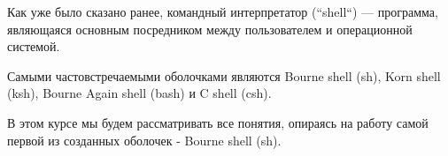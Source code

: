 Как уже было сказано ранее, командный интерпретатор (“shell“) --- программа, являющаяся основным посредником между пользователем и операционной системой.

Самыми частовстречаемыми оболочками являются Bourne shell (sh), Korn shell (ksh), Bourne Again shell (bash) и C shell (csh). 

\begin{important}
В этом курсе мы будем рассматривать все понятия, опираясь на работу самой первой из созданных оболочек - Bourne shell (sh). 
\end{important}
